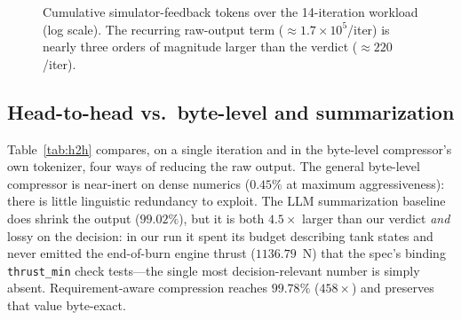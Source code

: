 \documentclass[10pt,twocolumn]{article}
\begin{document}
\begin{figure}[t]
\centering
{}
\caption{Cumulative simulator-feedback tokens over the 14-iteration workload
(log scale). The recurring raw-output term ($\approx\!1.7\times10^5$/iter) is
nearly three orders of magnitude larger than the verdict ($\approx\!220$/iter).}
\label{fig:cost}
\end{figure}

\subsection{Head-to-head vs.\ byte-level and summarization}

Table~\ref{tab:h2h} compares, on a single iteration and in the byte-level
compressor's own tokenizer, four ways of reducing the raw output. The general
byte-level compressor is near-inert on dense numerics ($0.45\%$ at maximum
aggressiveness): there is little linguistic redundancy to exploit. The LLM
summarization baseline does shrink the output ($99.02\%$), but it is both
$4.5\times$ larger than our verdict \emph{and} lossy on the decision: in our run it
spent its budget describing tank states and never emitted the end-of-burn engine
thrust ($1136.79$~N) that the spec's binding \texttt{thrust\_min} check tests---the
single most decision-relevant number is simply absent. Requirement-aware compression reaches
$99.78\%$ ($458\times$) and preserves that value byte-exact.
\end{document}
